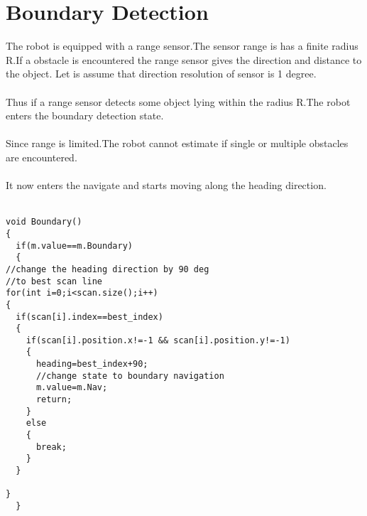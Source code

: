 \documentclass[fontsize=12pt, %
                             paper=a4, %
                             oneside, %
                             captions=tableheading,
                             index=totoc,
                             hyperref]{labbook}
\begin{document}
\section{Boundary Detection}
The robot is equipped with a range sensor.The sensor 
range is has a finite radius R.If a obstacle is encountered
the range sensor gives the direction and distance to the object.
Let is assume that direction resolution of sensor is 1 degree.
\\\\
Thus if a range sensor detects some object lying within
the radius R.The robot enters the boundary detection state.
\\\\
Since range is limited.The robot cannot estimate if
single or multiple obstacles are encountered.
\\\\
It now enters the navigate and starts moving along the heading direction.
\\\\
\begin{verbatim}
void Boundary()
{
  if(m.value==m.Boundary)
  {
//change the heading direction by 90 deg
//to best scan line
for(int i=0;i<scan.size();i++)
{
  if(scan[i].index==best_index)
  {	
    if(scan[i].position.x!=-1 && scan[i].position.y!=-1)
    {
      heading=best_index+90;
      //change state to boundary navigation
      m.value=m.Nav;
      return;
    }
    else
    {
      break;
    }
  }

}
  } 
\end{verbatim}
\end{document}
